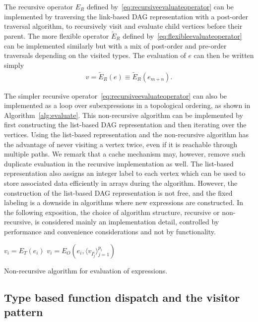 \documentclass[prodmode,acmtoms]{acmsmall}
\begin{document}
The recursive operator $E_R$ defined
by~\eqref{eq:recursiveevaluateoperator} can be implemented by
traversing the link-based DAG representation with a post-order
traversal algorithm, to recursively visit and evaluate child vertices
before their parent. The more flexible operator $\tilde{E}_R$ defined
by~\eqref{eq:flexibleevaluateoperator} can be implemented similarly
but with a mix of post-order and pre-order traversals depending on the
visited types. The evaluation of $e$ can then be written simply
\begin{align}
  \label{eq:evaluaterecursive}
  v = \tilde{E}_R(e) \equiv \tilde{E}_R(e_{m+n}).
\end{align}

The simpler recursive operator~\eqref{eq:recursiveevaluateoperator}
can also be implemented as a loop over subexpressions in a topological
ordering, as shown in Algorithm~\ref{alg:evaluate}.  This
non-recursive algorithm can be implemented by first constructing the
list-based DAG representation and then iterating over the vertices.
Using the list-based representation and the non-recursive algorithm
has the advantage of never visiting a vertex twice, even if it is
reachable through multiple paths. We remark that a cache mechanism
may, however, remove such duplicate evaluation in the recursive
implementation as well. The list-based representation also assigns an
integer label to each vertex which can be used to store associated
data efficiently in arrays during the algorithm.  However, the
construction of the list-based DAG representation is not free, and the
fixed labeling is a downside in algorithms where new expressions are
constructed. In the following exposition, the choice of algorithm
structure, recursive or non-recursive, is considered mainly an
implementation detail, controlled by performance and convenience
considerations and not by functionality.

\begin{algorithm}
  \begin{algorithmic}[1]
    \State $v_i = E_T(e_i)$
    \EndFor
    \State $v_i = E_O(e_i, \langle v_{I^i_j} \rangle_{j=1}^{p_i})$
    \EndFor
  \end{algorithmic}
  \caption{Non-recursive algorithm for evaluation of expressions.}
  \label{alg:evaluate}
\end{algorithm}

\subsection{Type based function dispatch and the visitor pattern}
\end{document}
